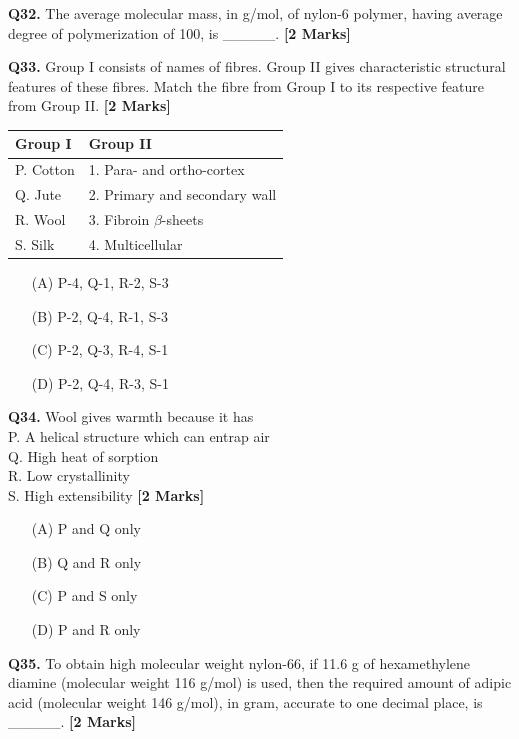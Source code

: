 \documentclass[11pt]{article}
\newcommand{\questionb}[2]{
    \noindent\textbf{Q#2.} #1 \hfill \textbf{[2 Marks]}
}
\begin{document}
\questionb{The average molecular mass, in g/mol, of nylon-6 polymer, having average degree of polymerization of 100, is \_\_\_\_\_.}{32}
\vspace{0.5cm}

\questionb{Group I consists of names of fibres. Group II gives characteristic structural features of these fibres. Match the fibre from Group I to its respective feature from Group II.}{33}

\begin{center}
\begin{tabular}{|l|l|}
\hline
\textbf{Group I} & \textbf{Group II} \\
\hline
P. Cotton & 1. Para- and ortho-cortex \\
Q. Jute & 2. Primary and secondary wall \\
R. Wool & 3. Fibroin \(\beta\)-sheets \\
S. Silk & 4. Multicellular \\
\hline
\end{tabular}
\end{center}

\begin{enumerate}
    \item[(A)] P-4, Q-1, R-2, S-3  
    \item[(B)] P-2, Q-4, R-1, S-3  
    \item[(C)] P-2, Q-3, R-4, S-1  
    \item[(D)] P-2, Q-4, R-3, S-1  
\end{enumerate}
\vspace{0.5cm}

\questionb{Wool gives warmth because it has\\
P. A helical structure which can entrap air \\ 
Q. High heat of sorption \\ 
R. Low crystallinity \\ 
S. High extensibility }{34} 
\begin{enumerate}
    \item[(A)] P and Q only  
    \item[(B)] Q and R only  
    \item[(C)] P and S only  
    \item[(D)] P and R only  
\end{enumerate}
\vspace{0.5cm}

\questionb{To obtain high molecular weight nylon-66, if 11.6 g of hexamethylene diamine (molecular weight 116 g/mol) is used, then the required amount of adipic acid (molecular weight 146 g/mol), in gram, accurate to one decimal place, is \_\_\_\_\_.}{35}
\vspace{0.5cm}
\end{document}
